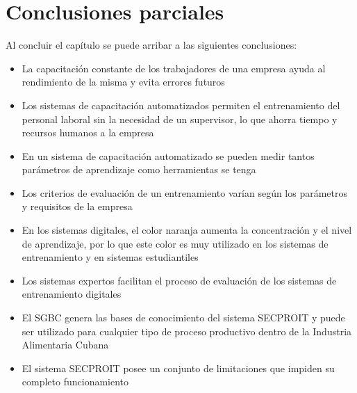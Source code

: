 \section{Conclusiones parciales}
Al concluir el capítulo se puede arribar a las siguientes conclusiones:
\begin{itemize}
\item La capacitación constante de los trabajadores de una empresa ayuda al rendimiento de la misma y evita errores futuros
\item Los sistemas de capacitación automatizados permiten el entrenamiento del personal laboral sin la necesidad de un supervisor, lo que ahorra tiempo y recursos humanos a la empresa
\item En un sistema de capacitación automatizado se pueden medir tantos parámetros de aprendizaje como herramientas se tenga
\item Los criterios de evaluación de un entrenamiento varían según los parámetros y requisitos de la empresa
\item En los sistemas digitales, el color naranja aumenta la concentración y el nivel de aprendizaje, por lo que este color es muy utilizado en los sistemas de entrenamiento y en sistemas estudiantiles
\item Los sistemas expertos facilitan el proceso de evaluación de los sistemas de entrenamiento digitales
\item El SGBC genera las bases de conocimiento del sistema SECPROIT y puede ser utilizado para cualquier tipo de proceso productivo dentro de la Industria Alimentaria Cubana
\item El sistema SECPROIT posee un conjunto de limitaciones que impiden su completo funcionamiento
\end{itemize}